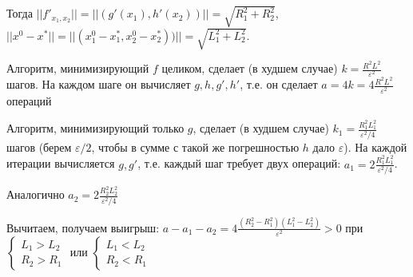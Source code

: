 \documentclass[a4paper]{article}
\begin{document}
Тогда $||f'_{x_1,x_2}||=||(g'(x_1),h'(x_2))||=\sqrt{R_1^2+R_2^2}$, $||x^0-x^*||=||(x_1^0-x_1^*,x_2^0-x_2^*))||=\sqrt{L_1^2+L_2^2}$.

Алгоритм, минимизирующий $f$ целиком, сделает (в худшем случае) $k=\frac{R^2L^2}{\varepsilon^2}$ шагов. На каждом шаге он вычисляет $g, h, g', h'$, т.е. он сделает $a=4k=4\frac{R^2L^2}{\varepsilon^2}$ операций

Алгоритм, минимизирующий только $g$, сделает (в худшем случае) $k_1=\frac{R_1^2L_1^2}{\varepsilon^2/4}$ шагов (берем $\varepsilon/2$, чтобы в сумме с такой же погрешностью $h$ дало $\varepsilon$). На каждой итерации вычисляется $g, g'$, т.е. каждый шаг требует двух операций: $a_1=2\frac{R_1^2L_1^2}{\varepsilon^2/4}$.

Аналогично $a_2=2\frac{R_2^2L_2^2}{\varepsilon^2/4}$

Вычитаем, получаем выигрыш: $a-a_1-a_2=4\frac{(R_2^2-R_1^2)(L_1^2-L_2^2)}{\varepsilon^2}>0$ при $\begin{cases}
L_1>L_2\\
R_2>R_1
\end{cases}$ или $\begin{cases}
L_1<L_2\\
R_2<R_1
\end{cases}$
\end{document}
